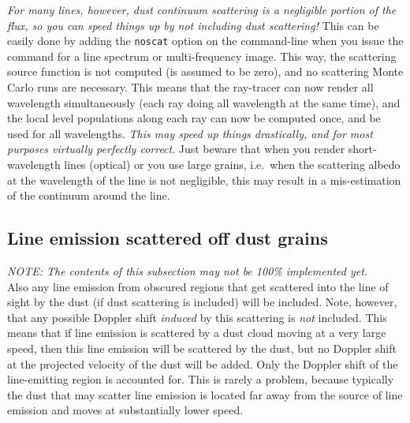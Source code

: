 \documentclass{report}
\begin{document}
{\em For many lines, however, dust continuum scattering is a negligible
  portion of the flux, so you can speed things up by not including dust
  scattering!} This can be easily done by adding the {\small\tt noscat}
option on the command-line when you issue the command for a line spectrum or
multi-frequency image. This way, the scattering source function is not
computed (is assumed to be zero), and no scattering Monte Carlo runs are
necessary. This means that the ray-tracer can now render all wavelength
simultaneously (each ray doing all wavelength at the same time), and the
local level populations along each ray can now be computed once, and be used
for all wavelengths. {\em This may speed up things drastically, and for most
  purposes virtually perfectly correct}. Just beware that when you render
short-wavelength lines (optical) or you use large grains, i.e.\ when the
scattering albedo at the wavelength of the line is not negligible, this may
result in a mis-estimation of the continuum around the line.



\subsection{Line emission scattered off dust grains}\label{sec-line-scat-off-dust}
{\em NOTE: The contents of this subsection may not be 100\% implemented yet.}\\

Also any line emission from obscured regions that get scattered into the
line of sight by the dust (if dust scattering is included) will be
included. Note, however, that any possible Doppler shift {\em induced} by
this scattering is {\em not} included. This means that if line emission is
scattered by a dust cloud moving at a very large speed, then this line
emission will be scattered by the dust, but no Doppler shift at the
projected velocity of the dust will be added. Only the Doppler shift of the
line-emitting region is accounted for. This is rarely a problem, because
typically the dust that may scatter line emission is located far away from
the source of line emission and moves at substantially lower speed.
\end{document}
